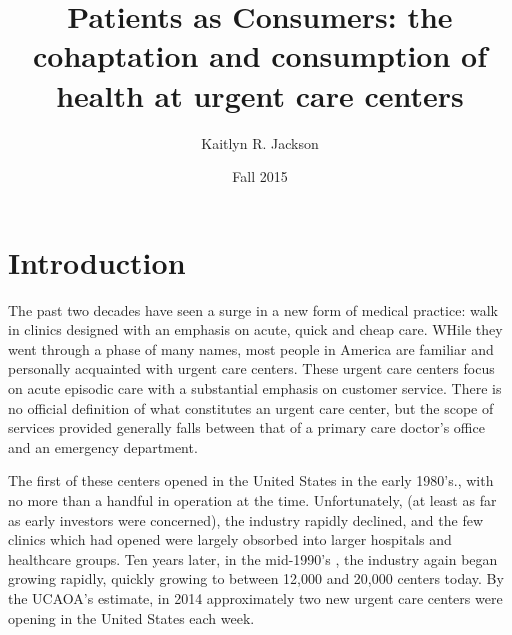 \documentclass[12pt,twoside]{reedthesis}
\title{Patients as Consumers: the cohaptation and consumption of health at
urgent care centers}
\author{Kaitlyn R. Jackson}
\date{Fall 2015}
\begin{document}
      \maketitle
  
  \frontmatter %
  \pagestyle{empty} %

  
  

      \hypersetup{linkcolor=black}
    \setcounter{tocdepth}{2}
    \tableofcontents
  
  
  
  
  
  \mainmatter %
  \pagestyle{fancyplain} %

  \chapter*{Introduction}\label{introduction}
  
  \onehalfspacing
  
  The past two decades have seen a surge in a new form of medical
  practice: walk in clinics designed with an emphasis on acute, quick and
  cheap care. WHile they went through a phase of many names, most people
  in America are familiar and personally acquainted with urgent care
  centers. These urgent care centers focus on acute episodic care with a
  substantial emphasis on customer service. There is no official
  definition of what constitutes an urgent care center, but the scope of
  services provided generally falls between that of a primary care
  doctor's office and an emergency department.
  
  The first of these centers opened in the United States in the early
  1980's., with no more than a handful in operation at the time.
  Unfortunately, (at least as far as early investors were concerned), the
  industry rapidly declined, and the few clinics which had opened were
  largely obsorbed into larger hospitals and healthcare groups. Ten years
  later, in the mid-1990's , the industry again began growing rapidly,
  quickly growing to between 12,000 and 20,000 centers today. By the
  UCAOA's estimate, in 2014 approximately two new urgent care centers were
  opening in the United States each week.
  
\end{document}
